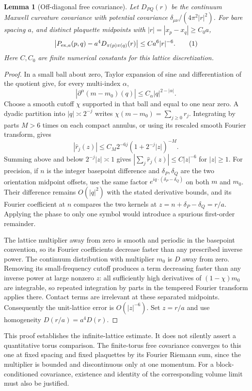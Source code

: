 \documentclass[11pt]{article}
\newtheorem{lemma}{Lemma}
\begin{document}
\begin{lemma}[Off-diagonal free covariance]
Let $D_{PQ}(r)$ be the continuum Maxwell curvature covariance with
potential covariance $\delta_{\mu\nu}/(4\pi^2|r|^2)$.
For bare spacing $a$, and distinct plaquette midpoints with
$|r|=|x_p-x_q|\geq C_0a$,
\[
\left|P_{{\rm ex},a}(p,q)-a^4D_{\pi(p)\pi(q)}(r)\right|
\leq C a^6|r|^{-6}.
\tag{1}
\]
Here $C,C_0$ are finite numerical constants for this lattice discretization.
\end{lemma}
\begin{proof}
In a small ball about zero, Taylor expansion of sine and differentiation
of the quotient give, for every multi-index $\alpha$,
\[
|\partial^\alpha(m-m_0)(q)|\leq C_\alpha|q|^{2-|\alpha|}.
\]
Choose a smooth cutoff $\chi$ supported in that ball and equal to one
near zero. A dyadic partition into $|q|\asymp2^{-j}$ writes
$\chi(m-m_0)=\sum_{j\geq0}r_j$. Integrating by parts $M>6$ times on
each compact annulus, or using its rescaled smooth Fourier transform,
gives
\[
|\widehat r_j(z)|\leq C_M2^{-6j}
(1+2^{-j}|z|)^{-M}.
\]
Summing above and below $2^{-j}|z|\asymp1$ gives
$|\sum_j\widehat r_j(z)|\leq C|z|^{-6}$ for $|z|\geq1$.
For precision, if $n$ is the integer basepoint difference and
$\delta_P,\delta_Q$ are the two orientation midpoint offsets, use the
same factor $e^{iq\cdot(\delta_P-\delta_Q)}$ on both $m$ and $m_0$.
Their difference remains $O(|q|^2)$ with the stated derivative bounds,
and its Fourier coefficient at $n$ compares the two kernels at
$z=n+\delta_P-\delta_Q=r/a$. Applying the phase to only one symbol
would introduce a spurious first-order remainder.

The lattice multiplier away from zero is smooth and periodic in the
basepoint convention, so its Fourier coefficients decrease faster than
any prescribed inverse power. The continuum distribution with
multiplier $m_0$ is $D$ away from zero. Removing its small-frequency
cutoff produces a term decreasing faster than any inverse power at
large nonzero $z$: all sufficiently high derivatives of
$(1-\chi)m_0$ are integrable, so repeated integration by parts in the
tempered Fourier transform applies there. Contact terms are irrelevant
at these separated midpoints.
Consequently the unit-lattice error is $O(|z|^{-6})$.
Set $z=r/a$ and use homogeneity $D(r/a)=a^4D(r)$.
\end{proof}

This proof establishes the infinite-lattice estimate. It does not silently
assert a quantitative torus comparison. The finite-torus free covariance
converges to this one at fixed spacing and fixed plaquettes by its Fourier
Riemann sum, since the multiplier is bounded and discontinuous only at
one momentum. For a block-conditioned covariance, existence and identity
of the corresponding volume limit must also be justified.
\end{document}
